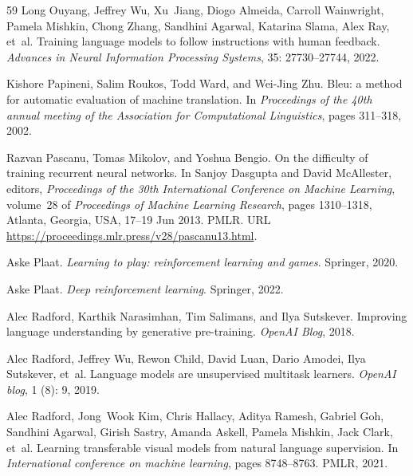\begin{thebibliography}{59}
Long Ouyang, Jeffrey Wu, Xu~Jiang, Diogo Almeida, Carroll Wainwright, Pamela Mishkin, Chong Zhang, Sandhini Agarwal, Katarina Slama, Alex Ray, et~al.
\newblock Training language models to follow instructions with human feedback.
\newblock \emph{Advances in Neural Information Processing Systems}, 35: 27730--27744, 2022.

Kishore Papineni, Salim Roukos, Todd Ward, and Wei-Jing Zhu.
\newblock Bleu: a method for automatic evaluation of machine translation.
\newblock In \emph{Proceedings of the 40th annual meeting of the Association for Computational Linguistics}, pages 311--318, 2002.

Razvan Pascanu, Tomas Mikolov, and Yoshua Bengio.
\newblock On the difficulty of training recurrent neural networks.
\newblock In Sanjoy Dasgupta and David McAllester, editors, \emph{Proceedings of the 30th International Conference on Machine Learning}, volume~28 of \emph{Proceedings of Machine Learning Research}, pages 1310--1318, Atlanta, Georgia, USA, 17--19 Jun 2013. PMLR.
\newblock URL \url{https://proceedings.mlr.press/v28/pascanu13.html}.

Aske Plaat.
\newblock \emph{Learning to play: reinforcement learning and games}.
\newblock Springer, 2020.

Aske Plaat.
\newblock \emph{Deep reinforcement learning}.
\newblock Springer, 2022.

Alec Radford, Karthik Narasimhan, Tim Salimans, and Ilya Sutskever.
\newblock Improving language understanding by generative pre-training.
\newblock \emph{OpenAI Blog}, 2018.

Alec Radford, Jeffrey Wu, Rewon Child, David Luan, Dario Amodei, Ilya Sutskever, et~al.
\newblock Language models are unsupervised multitask learners.
\newblock \emph{OpenAI blog}, 1 (8): 9, 2019.

Alec Radford, Jong~Wook Kim, Chris Hallacy, Aditya Ramesh, Gabriel Goh, Sandhini Agarwal, Girish Sastry, Amanda Askell, Pamela Mishkin, Jack Clark, et~al.
\newblock Learning transferable visual models from natural language supervision.
\newblock In \emph{International conference on machine learning}, pages 8748--8763. PMLR, 2021.


\end{thebibliography}
